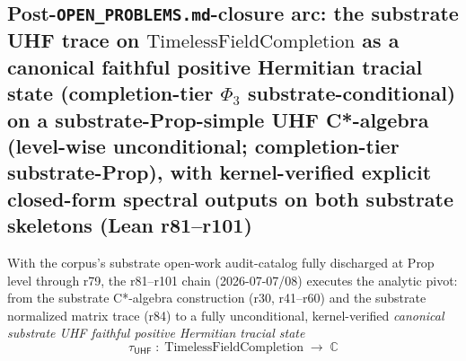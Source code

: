 \documentclass[11pt,a4paper]{amsart}
\theoremstyle{plain}
\theoremstyle{definition}
\begin{document}
\subsection{Post-\texttt{OPEN\_PROBLEMS.md}-closure arc: the substrate UHF trace on \texorpdfstring{$\text{TimelessFieldCompletion}$}{TimelessFieldCompletion} as a canonical faithful positive Hermitian tracial state (completion-tier $\Phi_3$ substrate-conditional) on a substrate-Prop-simple UHF C*-algebra (level-wise unconditional; completion-tier substrate-Prop), with kernel-verified explicit closed-form spectral outputs on both substrate skeletons (Lean r81--r101)}\label{subsec:post-closure-uhf-trace}

With the corpus's substrate open-work audit-catalog fully discharged at Prop level through r79, the r81--r101 chain (2026-07-07/08) executes the analytic pivot: from the substrate C*-algebra construction (r30, r41--r60) and the substrate normalized matrix trace (r84) to a fully unconditional, kernel-verified \emph{canonical substrate UHF faithful positive Hermitian tracial state}
\[
\tau_{\textsf{UHF}} \; : \; \text{TimelessFieldCompletion} \; \to \; \mathbb{C}
\]
\end{document}
